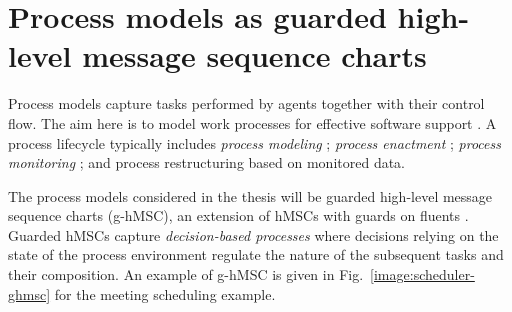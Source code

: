 \section{Process models as guarded high-level message sequence charts\label{section:background-process-models}}

Process models capture tasks performed by agents together with their control flow. The aim here is to model work processes for effective software support \cite{Dumas:2005}. A process lifecycle typically includes \emph{process modeling} \cite{OMG:2004, OMG:2008, Clarke:2008, Damas:2009}; \emph{process enactment} \cite{Manolescu:2002, Buhler:2005, Sauer:2006}; \emph{process monitoring} \cite{Muehlen:2000}; and process restructuring based on monitored data. 

The process models considered in the thesis will be guarded high-level message sequence charts (g-hMSC), an extension of hMSCs with guards on fluents \cite{Damas:2009, Damas:2011}. Guarded hMSCs capture \emph{decision-based processes} where decisions relying on the state of the process environment regulate the nature of the subsequent tasks and their composition. An example of g-hMSC is given in Fig.~\ref{image:scheduler-ghmsc} for the meeting scheduling example. 
